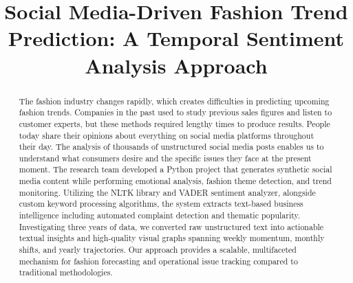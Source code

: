 \documentclass[conference]{IEEEtran}
\begin{document}
\title{Social Media-Driven Fashion Trend Prediction: A Temporal Sentiment Analysis Approach}

\author{
\and
{}
}

\maketitle

\begin{abstract}
The fashion industry changes rapidly, which creates difficulties in predicting upcoming fashion trends. Companies in the past used to study previous sales figures and listen to customer experts, but these methods required lengthy times to produce results. People today share their opinions about everything on social media platforms throughout their day. The analysis of thousands of unstructured social media posts enables us to understand what consumers desire and the specific issues they face at the present moment. The research team developed a Python project that generates synthetic social media content while performing emotional analysis, fashion theme detection, and trend monitoring. Utilizing the NLTK library and VADER sentiment analyzer, alongside custom keyword processing algorithms, the system extracts text-based business intelligence including automated complaint detection and thematic popularity. Investigating three years of data, we converted raw unstructured text into actionable textual insights and high-quality visual graphs spanning weekly momentum, monthly shifts, and yearly trajectories. Our approach provides a scalable, multifaceted mechanism for fashion forecasting and operational issue tracking compared to traditional methodologies.
\end{abstract}
\end{document}
